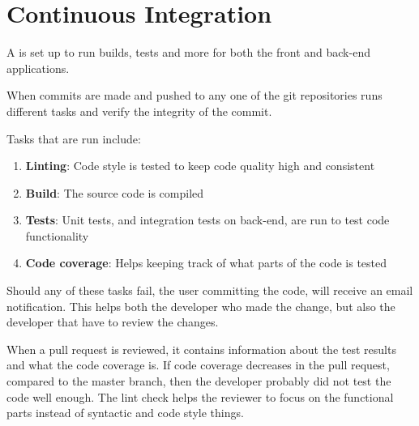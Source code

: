 \section{Continuous Integration}
A  is set up to run builds, tests and more for both the front and back-end applications.

When commits are made and pushed to any one of the git repositories  runs different tasks and verify the integrity of the commit.

Tasks that are run include:

\begin{enumerate}
\item \textbf{Linting}: Code style is tested to keep code quality high and consistent
\item \textbf{Build}: The source code is compiled
\item \textbf{Tests}: Unit tests, and integration tests on back-end, are run to test code functionality
\item \textbf{Code coverage}: Helps keeping track of what parts of the code is tested
\end{enumerate} 

Should any of these tasks fail, the user committing the code, will receive an email notification.
This helps both the developer who made the change, but also the developer that have to review the changes.

When a pull request is reviewed, it contains information about the test results and what the code coverage is.
If code coverage decreases in the pull request, compared to the master branch, then the developer probably did not test the code well enough. 
The lint check helps the reviewer to focus on the functional parts instead of syntactic and code style things.

